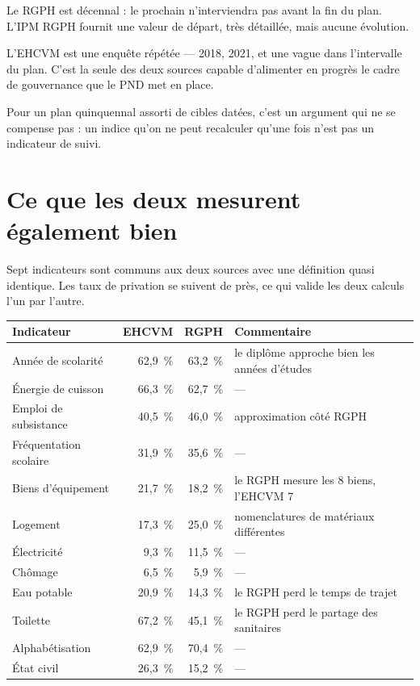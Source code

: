 \documentclass[11pt,a4paper]{article}
\begin{document}
\begin{attention}
Le RGPH est décennal : le prochain n'interviendra pas avant la fin du plan. L'IPM RGPH fournit une
valeur de départ, très détaillée, mais aucune évolution.

L'EHCVM est une enquête répétée --- 2018, 2021, et une vague dans l'intervalle du plan. C'est la
seule des deux sources capable d'alimenter en progrès le cadre de gouvernance que le PND met en
place.
\end{attention}

Pour un plan quinquennal assorti de cibles datées, c'est un argument qui ne se compense pas : un
indice qu'on ne peut recalculer qu'une fois n'est pas un indicateur de suivi.

\section{Ce que les deux mesurent également bien}

Sept indicateurs sont communs aux deux sources avec une définition quasi identique. Les taux de
privation se suivent de près, ce qui valide les deux calculs l'un par l'autre.

\begin{center}
\small
\begin{tabular}{@{}lrrl@{}}
\toprule
\textbf{Indicateur} & \textbf{EHCVM} & \textbf{RGPH} & \textbf{Commentaire} \\
\midrule
Année de scolarité & 62,9~\% & 63,2~\% & le diplôme approche bien les années d'études \\
Énergie de cuisson & 66,3~\% & 62,7~\% & --- \\
Emploi de subsistance & 40,5~\% & 46,0~\% & approximation côté RGPH \\
Fréquentation scolaire & 31,9~\% & 35,6~\% & --- \\
Biens d'équipement & 21,7~\% & 18,2~\% & le RGPH mesure les 8 biens, l'EHCVM 7 \\
Logement & 17,3~\% & 25,0~\% & nomenclatures de matériaux différentes \\
Électricité & 9,3~\% & 11,5~\% & --- \\
Chômage & 6,5~\% & 5,9~\% & --- \\
\addlinespace
Eau potable & 20,9~\% & 14,3~\% & le RGPH perd le temps de trajet \\
Toilette & 67,2~\% & 45,1~\% & le RGPH perd le partage des sanitaires \\
Alphabétisation & 62,9~\% & 70,4~\% & --- \\
État civil & 26,3~\% & 15,2~\% & --- \\
\bottomrule
\end{tabular}
\end{center}
\end{document}
